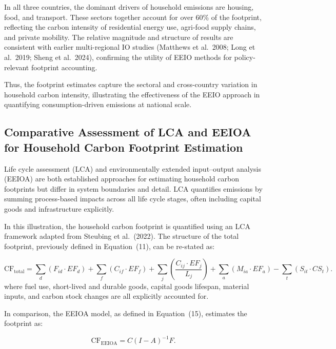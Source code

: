 \documentclass[12pt,a4paper]{article}%
\begin{document}
In all three countries, the dominant drivers of household emissions are housing, food, and transport. These sectors together account for over 60\% of the footprint, reflecting the carbon intensity of residential energy use, agri-food supply chains, and private mobility. The relative magnitude and structure of results are consistent with earlier multi-regional IO studies (Matthews et al.~2008; Long et al.~2019; Sheng et al.~2024), confirming the utility of EEIO methods for policy-relevant footprint accounting.

Thus, the footprint estimates capture the sectoral and cross-country variation in household carbon intensity, illustrating the effectiveness of the EEIO approach in quantifying consumption-driven emissions at national scale.


\subsection{Comparative Assessment of LCA and EEIOA for Household Carbon Footprint Estimation}

Life cycle assessment (LCA) and environmentally extended input--output analysis (EEIOA) are both established approaches for estimating household carbon footprints but differ in system boundaries and detail. LCA quantifies emissions by summing process-based impacts across all life cycle stages, often including capital goods and infrastructure explicitly.

In this illustration, the household carbon footprint is quantified using an LCA framework adapted from Steubing et al.~(2022). The structure of the total footprint, previously defined in Equation~(11), can be re-stated as:

\begin{equation}
\text{CF}_{\text{total}} = \sum_d (F_{id} \cdot EF_d) 
+ \sum_f (C_{if} \cdot EF_f) 
+ \sum_j \left( \frac{C_{ij} \cdot EF_j}{L_j} \right)
+ \sum_a (M_{ia} \cdot EF_a)
- \sum_t (S_{it} \cdot CS_t).
\end{equation}
where fuel use, short-lived and durable goods, capital goods lifespan, material inputs, and carbon stock changes are all explicitly accounted for.

In comparison, the EEIOA model, as defined in Equation~(15), estimates the footprint as:

\begin{equation}
\text{CF}_{\text{EEIOA}} = {C (I - A)}^{-1} F.
\end{equation}
\end{document}
